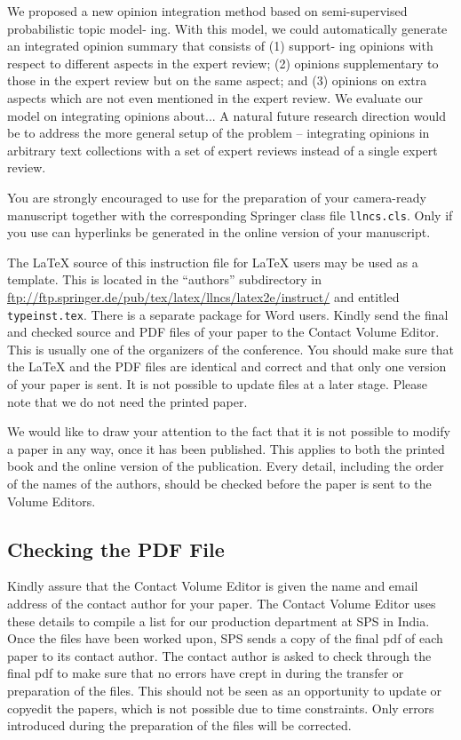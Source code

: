 \documentclass[runningheads,a4paper]{llncs}
\begin{document}
{We proposed a new opinion integration method based on semi-supervised probabilistic topic model- ing. With this model, we could automatically generate an integrated opinion summary that consists of (1) support- ing opinions with respect to different aspects in the expert review; (2) opinions supplementary to those in the expert review but on the same aspect; and (3) opinions on extra aspects which are not even mentioned in the expert review. We evaluate our model on integrating opinions about...
A natural future research direction would be to address the more general setup of the problem – integrating opinions in arbitrary text collections with a set of expert reviews instead of a single expert review.

You are strongly encouraged to use \LaTeXe{} for the
preparation of your camera-ready manuscript together with the
corresponding Springer class file \verb+llncs.cls+. Only if you use
\LaTeXe{} can hyperlinks be generated in the online version
of your manuscript.

The \LaTeX{} source of this instruction file for \LaTeX{} users may be
used as a template. This is
located in the ``authors'' subdirectory in
\url{ftp://ftp.springer.de/pub/tex/latex/llncs/latex2e/instruct/} and
entitled \texttt{typeinst.tex}. There is a separate package for Word 
users. Kindly send the final and checked source
and PDF files of your paper to the Contact Volume Editor. This is
usually one of the organizers of the conference. You should make sure
that the \LaTeX{} and the PDF files are identical and correct and that
only one version of your paper is sent. It is not possible to update
files at a later stage. Please note that we do not need the printed
paper.

We would like to draw your attention to the fact that it is not possible
to modify a paper in any way, once it has been published. This applies
to both the printed book and the online version of the publication.
Every detail, including the order of the names of the authors, should
be checked before the paper is sent to the Volume Editors.

\subsection{Checking the PDF File}

Kindly assure that the Contact Volume Editor is given the name and email
address of the contact author for your paper. The Contact Volume Editor
uses these details to compile a list for our production department at
SPS in India. Once the files have been worked upon, SPS sends a copy of
the final pdf of each paper to its contact author. The contact author is
asked to check through the final pdf to make sure that no errors have
crept in during the transfer or preparation of the files. This should
not be seen as an opportunity to update or copyedit the papers, which is
not possible due to time constraints. Only errors introduced during the
preparation of the files will be corrected.

}
\end{document}
